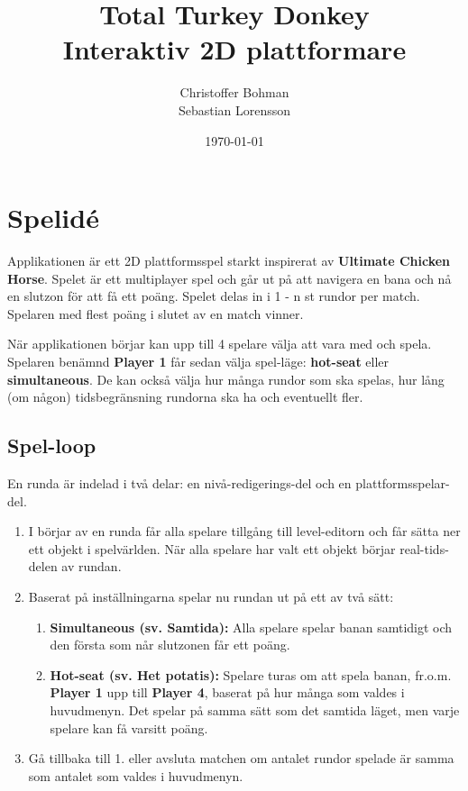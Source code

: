 \documentclass{article}
\title{Total Turkey Donkey\\\large{Interaktiv 2D plattformare}}
\author{Christoffer Bohman \\ Sebastian Lorensson
}
\date{\today}
\begin{document}
\maketitle


\section{Spelidé}

Applikationen är ett 2D plattformsspel starkt inspirerat av \textbf{Ultimate Chicken Horse}. Spelet är ett multiplayer spel och går ut på att navigera en bana och nå en slutzon för att få ett poäng. Spelet delas in i  1 - n st rundor per match. Spelaren med flest poäng i slutet av en match vinner.

När applikationen börjar kan upp till 4 spelare välja att vara med och spela. Spelaren benämnd \textbf{Player 1} får sedan välja spel-läge: \textbf{hot-seat} eller \textbf{simultaneous}. De kan också välja hur många rundor som ska spelas, hur lång (om någon) tidsbegränsning rundorna ska ha och eventuellt fler.

\subsection{Spel-loop}
En runda är indelad i två delar: en nivå-redigerings-del och en plattformsspelar-del.
\begin{enumerate}
    \item I börjar av en runda får alla spelare tillgång till level-editorn och får sätta ner ett objekt i spelvärlden. När alla spelare har valt ett objekt börjar real-tids-delen av rundan.
    \item Baserat på inställningarna spelar nu rundan ut på ett av två sätt:
    \begin{enumerate}
        \item \textbf{Simultaneous (sv. Samtida):} Alla spelare spelar banan samtidigt och den första som når slutzonen får ett poäng.
        \item \textbf{Hot-seat (sv. Het potatis):} Spelare turas om att spela banan, fr.o.m. \textbf{Player 1} upp till \textbf{Player 4}, baserat på hur många som valdes i huvudmenyn. Det spelar på samma sätt som det samtida läget, men varje spelare kan få varsitt poäng.
    \end{enumerate}
    \item Gå tillbaka till 1. eller avsluta matchen om antalet rundor spelade är samma som antalet som valdes i huvudmenyn.
\end{enumerate}
\end{document}
